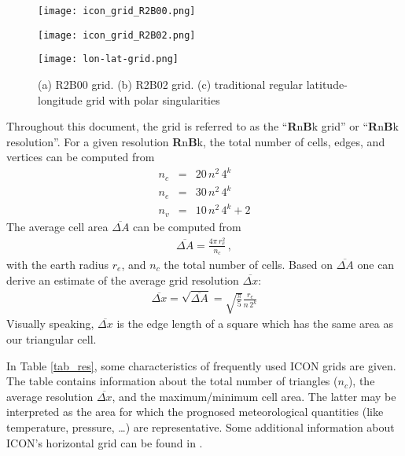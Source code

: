 \begin{figure}[h]
  \begin{minipage}[b]{0.3\textwidth}
    \centering
    \texttt{[image: icon\_grid\_R2B00.png]}
    \subcaption{}\label{fig_R2B00}
  \end{minipage}\hfill
  \begin{minipage}[b]{0.3\textwidth}
    \centering
    \texttt{[image: icon\_grid\_R2B02.png]}
    \subcaption{}\label{fig_R2B02}
  \end{minipage}\hfill
  \begin{minipage}[b]{0.3\textwidth}
    \centering
    \texttt{[image: lon-lat-grid.png]}
    \subcaption{}\label{fig_lonlat}
  \end{minipage}\hfill
  \caption{(a) R2B00 grid. (b) R2B02 grid. (c) traditional regular latitude-longitude grid with polar singularities}
\end{figure}

Throughout this document, the grid is referred to as the ``\textbf{R}n\textbf{B}k grid'' or ``\textbf{R}n\textbf{B}k resolution''. For a given resolution \textbf{R}n\textbf{B}k, 
the total number of cells, edges, and vertices can be computed from
\begin{eqnarray*}
 n_{c} &=& 20\,n^{2}\,4^{k} \\
 n_{e} &=& 30\,n^{2}\,4^{k} \\
 n_{v} &=& 10\,n^{2}\,4^{k} + 2
\end{eqnarray*}
The average cell area $\overline{\Delta A}$ can be computed from
\begin{align*}
 \overline{\Delta A} = \frac{4\pi\,r_{e}^{2}}{n_{c}}\,,
\end{align*}
with the earth radius $r_{e}$, and $n_{c}$ the total number of cells. Based on $\overline{\Delta A}$ one can derive an estimate of the average grid resolution 
$\overline{\Delta x}$:
\begin{align*}
 \overline{\Delta x} = \sqrt{\overline{\Delta A}} = \sqrt{\frac{\pi}{5}} \frac{r_{e}}{n\,2^{k}}
\end{align*}
Visually speaking, $\overline{\Delta x}$ is the edge length of a square which has the same area as our triangular cell.


In Table \ref{tab_res}, some characteristics of frequently used ICON grids are given. The table contains information about the total number of triangles ($n_{c}$), the average 
resolution $\overline{\Delta x}$, and the maximum/minimum cell area. The latter may be interpreted as the area for which the prognosed meteorological quantities (like temperature, 
pressure, \dots) are representative. Some additional information about ICON's horizontal grid can be found in \citet{Wan13}.

